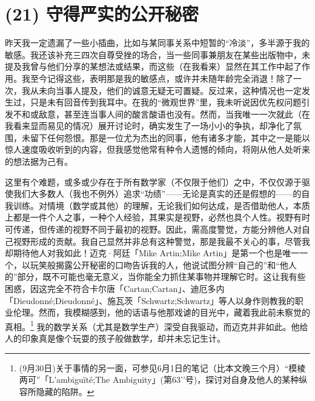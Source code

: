 \section{(21) 守得严实的公开秘密}

昨天我一定遗漏了一些小插曲，比如与某同事关系中短暂的“冷淡”，多半源于我的敏感。我还该补充三四次自尊受挫的场合，当一些同事兼朋友在某些出版物中，未提及我曾与他们分享的某想法或结果，而这些（在我看来）显然在其工作中起了作用。我至今记得这些，表明那是我的敏感点，或许并未随年龄完全消退！除了一次，我从未向当事人提及，他们的诚意无疑无可置疑。反过来，这种情况也一定发生过，只是未有回音传到我耳中。在我的“微观世界”里，我未听说因优先权问题引发不和或敌意，甚至连当事人间的酸言酸语也没有。然而，当我唯一一次就此（在我看来显而易见的情况）展开讨论时，确实发生了一场小小的争执，却净化了氛围，未留下任何怨恨。那是一位尤为杰出的同事，他有诸多才能，其中之一是能以惊人速度吸收听到的内容，但我感觉他常有种令人遗憾的倾向，将刚从他人处听来的想法据为己有。

这里有个难题，或多或少存在于所有数学家（不仅限于他们）之中，不仅仅源于驱使我们大多数人（我也不例外）追求“功绩”——无论是真实的还是假想的——的自我训练。对情境（数学或其他）的理解，无论我们如何达成，是否借助他人，本质上都是一件个人之事，一种个人经验，其果实是视野，必然也具个人性。视野有时可传递，但传递的视野不同于最初的视野。因此，需高度警觉，方能分辨他人对自己视野形成的贡献。我自己显然并非总有这种警觉，那是我最不关心的事，尽管我却期待他人对我如此！迈克·阿廷「Mike Artin;Mike Artin」是第一个也是唯一一个，以玩笑般揭露公开秘密的口吻告诉我的人，他说试图分辨“自己的”和“他人的”部分，既不可能也毫无意义，当你能全力抓住某事物并理解它时。这让我有些困惑，因这完全不符合卡尔唐「Cartan;Cartan」、迪厄多内「Dieudonné;Dieudonné」、施瓦茨「Schwartz;Schwartz」等人以身作则教我的职业伦理。然而，我模糊感到，他的话语与他那戏谑的目光中，藏着我此前未察觉的真相。\footnote{(9月30日)关于事情的另一面，可参见6月1日的笔记（比本文晚三个月）“模棱两可”「L’ambiguïté;The Ambiguity」(第63’’号)，探讨对自身及他人的某种纵容所隐藏的陷阱。} 我的数学关系（尤其是数学生产）深受自我驱动，而迈克并非如此。他给人的印象真是像个玩耍的孩子般做数学，却并未忘记生计。